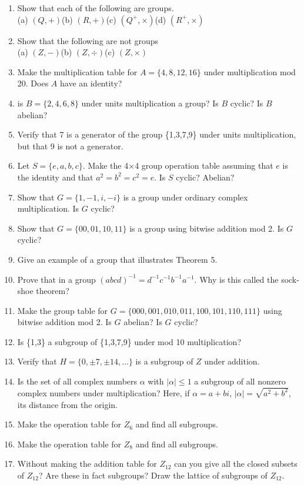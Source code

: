 \documentclass[12pt]{book}
\theoremstyle{definition}
\begin{document}
\begin{enumerate}
\item Show that each of the following are groups.\\
(a) $(Q,+)$\qquad(b) $(R,+)$\qquad(c) $(Q^+,\times)$\qquad(d) $(R^+,\times)$
\item Show that the following are not groups\\
(a) $(Z,-)$\qquad (b) $(Z,\div)$\qquad (c) $(Z,\times)$
\item Make the multiplication table for $A=\{4,8,12,16\}$ under multiplication mod 20.  Does $A$ have an identity?
\item is $B=\{2,4,6,8\}$ under units multiplication a group?  Is $B$ cyclic?  Is $B$ abelian?
\item Verify that 7 is a generator of the group \{1,3,7,9\} under units multiplication, but that 9 is not a generator.
\item Let $S=\{e,a,b,c\}$.  Make the 4$\times$4 group operation table assuming that $e$ is the identity and that $a^2=b^2=c^2=e$.  Is $S$ cyclic?  Abelian?
\item Show that $G=\{1,-1,i,-i\}$ is a group under ordinary complex multiplication.  Is $G$ cyclic?
\item Show that $G=\{00,01,10,11\}$ is a group using bitwise addition mod 2.  Is $G$ cyclic?
\item Give an example of a group that illustrates Theorem 5.
\item Prove that in a group $(abcd)^{-1}=d^{-1}c^{-1}b^{-1}a^{-1}$.  Why is this called the sock-shoe theorem?
\item Make the group table for $G=\{000,001,010,011,100,101,110,111\}$ using bitwise addition mod 2.  Is $G$ abelian?  Is $G$ cyclic?
\item Is \{1,3\} a subgroup of \{1,3,7,9\} under mod 10 multiplication?
\item Verify that $H=\{0,\pm7,\pm14,\dots\}$ is a subgroup of $Z$ under addition.
\item Is the set of all complex numbers $\alpha$ with $|\alpha|\leq1$ a subgroup of all nonzero complex numbers under multiplication?  Here, if $\alpha = a+bi$, $|\alpha|=\sqrt{a^2+b^2}$, its distance from the origin.
\item Make the operation table for $Z_6$ and find all subgroups.
\item Make the operation table for $Z_8$ and find all subgroups.
\item Without making the addition table for $Z_{12}$ can you give all the closed subsets of $Z_{12}$?  Are these in fact subgroups?  Draw the lattice of subgroups of $Z_{12}$.

\end{enumerate}
\end{document}
